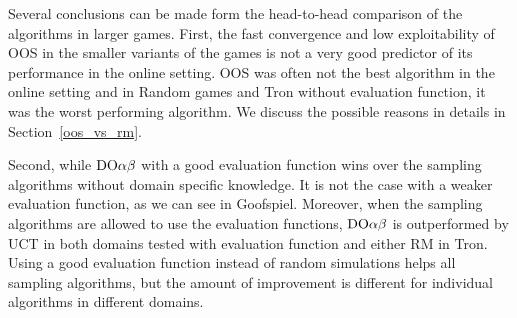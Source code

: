 

Several conclusions can be made form the head-to-head comparison of the algorithms in larger games.
First, the fast convergence and low exploitability of OOS in the smaller variants of the games is not a very good predictor of its performance in the online setting. OOS was often not the best algorithm in the online setting and in Random games and Tron without evaluation function, it was the worst performing algorithm. We discuss the possible reasons in details in Section~\ref{oos_vs_rm}.

Second, while $\textrm{DO}\alpha\beta$ with a good evaluation function wins over the sampling algorithms without domain specific knowledge.
It is not the case with a weaker evaluation function, as we can see in Goofspiel.
Moreover, when the sampling algorithms are allowed to use the evaluation functions, $\textrm{DO}\alpha\beta$ is outperformed by UCT in both domains tested with evaluation function and either RM in Tron.
Using a good evaluation function instead of random simulations helps all sampling algorithms, but the amount of improvement is different for individual algorithms in different domains.

